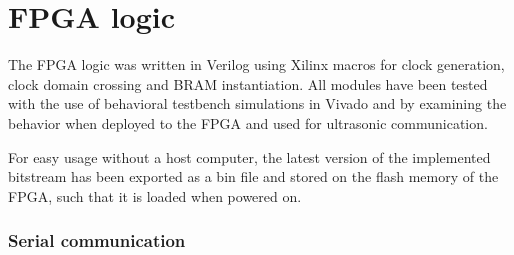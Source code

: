 \documentclass[
	english,
	ruledheaders=section, %
	class=report,%
	thesis={type=Project Seminar Report},%
	accentcolor=TUDa-1d, %
	custommargins=false,%
	marginpar=false,%
	parskip=half-,%
	fontsize=11pt,%
]{tudapub}
\begin{document}
\section{FPGA logic}
The \gls{FPGA} logic was written in Verilog using Xilinx macros for clock generation, clock domain crossing and \gls{BRAM} instantiation. All modules have been tested with the use of behavioral testbench simulations in Vivado and by examining the behavior when deployed to the \gls{FPGA} and used for ultrasonic communication.

For easy usage without a host computer, the latest version of the implemented bitstream has been exported as a bin file and stored on the flash memory of the \gls{FPGA}, such that it is loaded when powered on.

\subsubsection{Serial communication}
\end{document}
